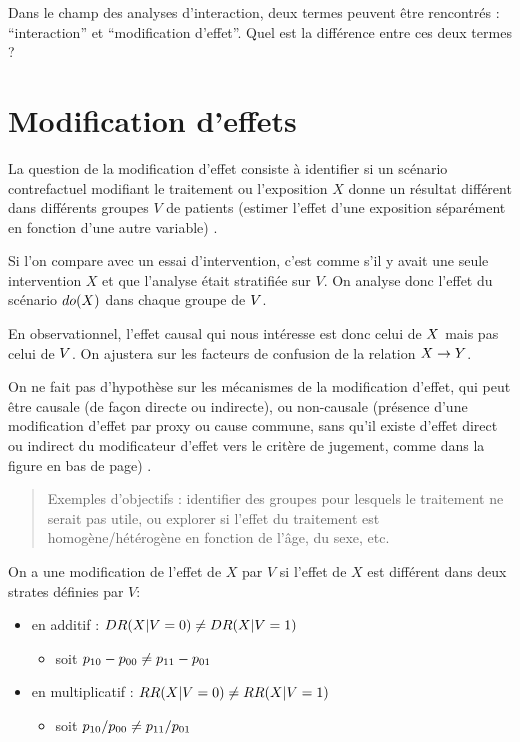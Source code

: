 \documentclass[
]{book}
\providecommand{\tightlist}{%
  \setlength{\itemsep}{0pt}\setlength{\parskip}{0pt}}
\begin{document}
Dans le champ des analyses d'interaction, deux termes peuvent être rencontrés : ``interaction'' et ``modification d'effet''. Quel est la différence entre ces deux termes ?

\hypertarget{modification-deffets}{%
\section{Modification d'effets}\label{modification-deffets}}

La question de la modification d'effet consiste à identifier si un scénario contrefactuel modifiant le traitement ou l'exposition \(X\) donne un résultat différent dans différents groupes \(V\) de patients (estimer l'effet d'une exposition séparément en fonction d'une autre variable) \citet{corraini_effect_2017}.

Si l'on compare avec un essai d'intervention, c'est comme s'il y avait une seule intervention \(X\) et que l'analyse était stratifiée sur \(V\). On analyse donc l'effet du scénario \(\small do(X)\) dans chaque groupe de \(\small V\).

En observationnel, l'effet causal qui nous intéresse est donc celui de \(\small X\) mais pas celui de \(\small V\).
On ajustera sur les facteurs de confusion de la relation \(\small X \rightarrow Y\).

On ne fait pas d'hypothèse sur les mécanismes de la modification d'effet, qui peut être causale (de façon directe ou indirecte), ou non-causale (présence d'une modification d'effet par proxy ou cause commune, sans qu'il existe d'effet direct ou indirect du modificateur d'effet vers le critère de jugement, comme dans la figure en bas de page) \citet{vanderweele_four_2007}.

\begin{quote}
Exemples d'objectifs : identifier des groupes pour lesquels le traitement ne serait pas utile, ou explorer si l'effet du traitement est homogène/hétérogène en fonction de l'âge, du sexe, etc.
\end{quote}

On a une modification de l'effet de \(X\) par \(V\) si l'effet de \(X\) est différent dans deux strates définies par \(V\):

\begin{itemize}
\tightlist
\item
  en additif : \(\small DR(X | V=0) \neq DR(X | V=1)\)

  \begin{itemize}
  \tightlist
  \item
    soit \(\small p_{10}-p_{00} \neq p_{11}-p_{01}\)\\
  \end{itemize}
\item
  en multiplicatif : \(\small RR(X | V=0) \neq RR(X | V=1)\)

  \begin{itemize}
  \tightlist
  \item
    soit \(\small p_{10}/p_{00} \neq p_{11}/p_{01}\)
  \end{itemize}
\end{itemize}
\end{document}
